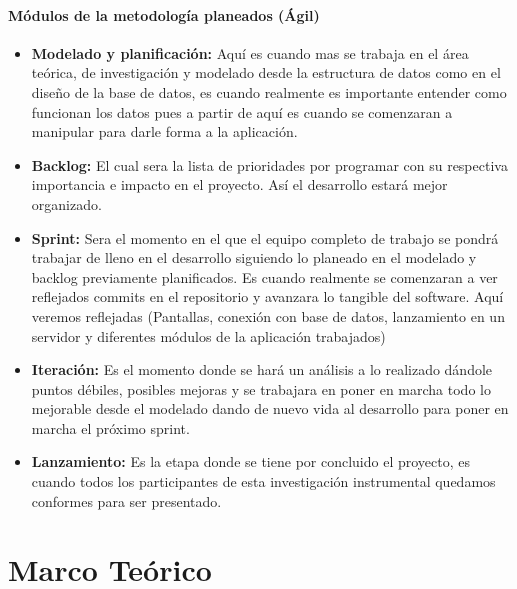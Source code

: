 \documentclass[12pt]{book}
\begin{document}
        \subsubsection{Módulos de la metodología planeados (Ágil)}
        {\normalsize \begin{itemize}
            \item \textbf{Modelado y planificación:} Aquí es cuando mas se trabaja en el área teórica, de investigación y modelado desde la estructura de datos como en el diseño de la base de datos, es cuando realmente es importante entender como funcionan los datos pues a partir de aquí es cuando se comenzaran a manipular para darle forma a la aplicación.
            
            \item \textbf{Backlog:} El cual sera la lista de prioridades por programar con su respectiva importancia e impacto en el proyecto. Así el desarrollo estará mejor organizado.

            \item \textbf{Sprint:} Sera el momento en el que el equipo completo de trabajo se pondrá trabajar de lleno en el desarrollo siguiendo lo planeado en el modelado y backlog previamente planificados.
            Es cuando realmente se comenzaran a ver reflejados commits en el repositorio y avanzara lo tangible del software. Aquí veremos reflejadas (Pantallas, conexión con base de datos, lanzamiento en un servidor y diferentes módulos de la aplicación trabajados)

            \item \textbf{Iteración:} Es el momento donde se hará un análisis a lo realizado dándole puntos débiles, posibles mejoras y se trabajara en poner en marcha todo lo mejorable desde el modelado dando de nuevo vida al desarrollo para poner en marcha el próximo sprint. 

            \item \textbf{Lanzamiento:} Es la etapa donde se tiene por concluido el proyecto, es cuando todos los participantes de esta investigación instrumental quedamos conformes para ser presentado. 

        \end{itemize}}


 
	\chapter{Marco Teórico}
\end{document}
